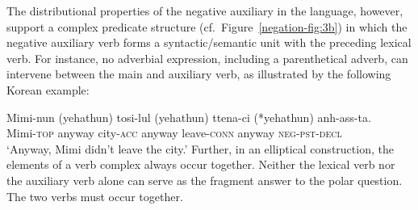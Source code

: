 \documentclass[output=paper
                ,modfonts
                ,nonflat
	        ,collection
	        ,collectionchapter
	        ,collectiontoclongg
 	        ,biblatex
                ,babelshorthands
                ,newtxmath
                ,draftmode
                ,colorlinks, citecolor=brown
]{./langsci/langscibook}
\begin{document}
{\begin{exe}
\begin{xlist}
\begin{exe}
\begin{xlist}
The distributional properties of the negative auxiliary in the language, however, support
 a complex predicate structure (cf.\ Figure~\ref{negation-fig:3b}) in which the negative auxiliary verb
forms a syntactic/semantic unit with the preceding lexical verb.
For instance, no adverbial expression, including
a parenthetical adverb, can intervene between
the main and auxiliary verb, as illustrated by the
following Korean example:

\ea
\gll Mimi-nun          (yehathun)           tosi-lul          (yehathun)           ttena-ci            (*yehathun) anh-ass-ta. \\
     Mimi-\textsc{top} anyway city-\textsc{acc} anyway leave-\textsc{conn} anyway \textsc{neg}-\textsc{pst}-\textsc{decl} \\
\glt `Anyway, Mimi didn't leave the city.'
\z
%
Further, in an elliptical construction, the elements of a verb complex
 always occur together. Neither the lexical  verb nor the auxiliary verb alone can serve
as the fragment answer to the polar question. The two verbs
must occur together.

\eal
\label{negation-fragment}
\zl


\end{xlist}
\end{exe}
\end{xlist}
\end{exe}}
\end{document}
